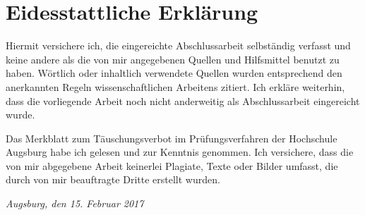 \newpage
\section*{Eidesstattliche Erklärung}
\thispagestyle{empty}

\vspace{1cm}

Hiermit versichere ich, die eingereichte Abschlussarbeit selbständig verfasst
und keine andere als die von mir angegebenen Quellen und Hilfsmittel benutzt zu
haben. Wörtlich oder inhaltlich verwendete Quellen wurden entsprechend den
anerkannten Regeln wissenschaftlichen Arbeitens zitiert. Ich erkläre weiterhin,
dass die vorliegende Arbeit noch nicht anderweitig als Abschlussarbeit
eingereicht wurde.

Das Merkblatt zum Täuschungsverbot im Prüfungsverfahren der Hochschule Augsburg
habe ich gelesen und zur Kenntnis genommen. Ich versichere, dass die von mir
abgegebene Arbeit keinerlei Plagiate, Texte oder Bilder umfasst, die durch von
mir beauftragte Dritte erstellt wurden.

\vspace{3cm}
\hfill\underline{\hspace{4cm}}

\vspace{0.2cm}
\textit{Augsburg, den 15. Februar 2017} \hfill \textit{\ThesisAuthor}
